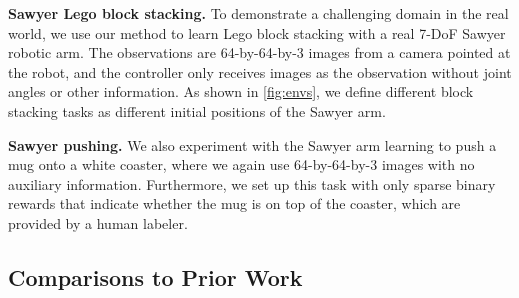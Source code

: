 {\bf Sawyer Lego block stacking.} To demonstrate a challenging domain in the real world, we use our method to learn Lego block stacking with a real 7-DoF Sawyer robotic arm. The observations are \mbox{64-by-64-by-3} images from a camera pointed at the robot, and the controller only receives images as the observation without joint angles or other information. As shown in \autoref{fig:envs}, we define different block stacking tasks as different initial positions of the Sawyer arm.

{\bf Sawyer pushing.} We also experiment with the Sawyer arm learning to push a mug onto a white coaster, where we again use \mbox{64-by-64-by-3} images with no auxiliary information. Furthermore, we set up this task with only sparse binary rewards that indicate whether the mug is on top of the coaster, which are provided by a human labeler.

\subsection{Comparisons to Prior Work}

